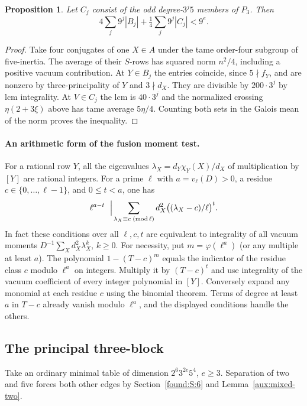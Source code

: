 \documentclass[11pt,a4paper]{article}
\numberwithin{equation}{section}
\newtheorem{proposition}[theorem]{Proposition}
\theoremstyle{remark}
\begin{document}
\begin{proposition}\label{found:F:5.1}\label{found:F:key:thm:upperseparated}
Let $C_j$ consist of the odd degree-$3^j5$ members of $P_3$. Then
\[
 4\sum_j9^j |B_j|+\tfrac14\sum_j9^j|C_j|<9^e .
\]
\end{proposition}
\begin{proof}
Take four conjugates of one $X\in A$ under the tame order-four
subgroup of five-inertia. The average of their $S$-rows has squared
norm $n^2/4$, including a positive vacuum contribution. At $Y\in B_j$
the entries coincide, since $5\nmid f_Y$, and are nonzero by
three-principality of $Y$ and $3\nmid d_X$. They are divisible
by $200\cdot3^j$ by lcm integrality. At $V\in C_j$ the lcm is
$40\cdot3^j$ and the normalized crossing $\eta(2+3\xi)$ above
has tame average $5\eta/4$. Counting both sets in the Galois mean
of the norm proves the inequality.
\end{proof}
\paragraph{An arithmetic form of the fusion moment test.}
For a rational row $Y$, all the eigenvalues
$\lambda_X=d_Y\chi_Y(X)/d_X$ of multiplication by $[Y]$ are rational
integers. For a prime $\ell$ with $a=v_\ell(D)>0$, a residue
$c\in\{0,\ldots,\ell-1\}$, and $0\le t<a$, one has
\[
 \ell^{a-t}\ \Bigm|\!
 \sum_{\lambda_X\equiv c\; (\mathrm{mod}\,\ell)}
       d_X^2\big((\lambda_X-c)/\ell\big)^t .
\]
In fact these conditions over all $\ell,c,t$ are equivalent to
integrality of all vacuum moments
$D^{-1}\sum_X d_X^2\lambda_X^k$, $k\ge0$.
For necessity, put $m=\varphi(\ell^a)$ (or any multiple at least
$a$). The polynomial $1-(T-c)^m$ equals the indicator of the
residue class $c$ modulo $\ell^a$ on integers. Multiply it by
$(T-c)^t$ and use integrality of the vacuum coefficient of every
integer polynomial in $[Y]$. Conversely expand any monomial at each
residue $c$ using the binomial theorem. Terms of degree at least
$a$ in $T-c$ already vanish modulo $\ell^a$, and the displayed
conditions handle the others.

\subsection{The principal three-block}\label{found:P:1}
Take an ordinary minimal table of dimension $2^6 3^{2e}5^4$, $e\ge3$. Separation of two and five forces both other edges by Section~\ref{found:S:6} and Lemma~\ref{aux:mixed-two}.
\end{document}
